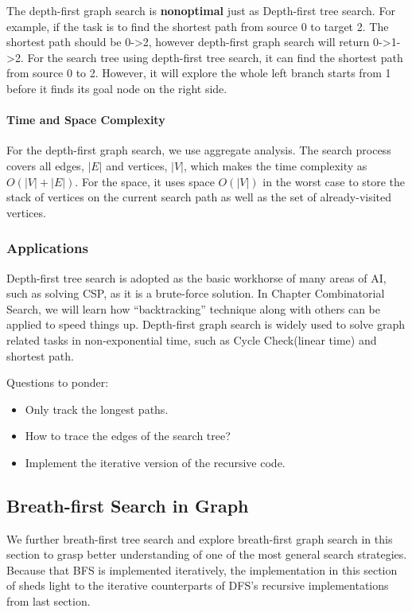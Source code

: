 \documentclass[../main.tex]{subfiles}
\begin{document}
The depth-first graph search is \textbf{nonoptimal} just as Depth-first tree search. For example, if the task is to find the shortest path from source 0 to target 2. The shortest path should be 0->2, however depth-first graph search will return 0->1->2. For the search tree using depth-first tree search, it can find the shortest path from source 0 to 2. However, it will explore the whole left branch starts from 1 before it finds its goal node on the right side. 

\paragraph{Time and Space Complexity}   For the depth-first graph search, we use aggregate analysis. The search process covers all edges, $|E|$ and vertices, $|V|$, which makes the time complexity as $O(|V|+|E|)$. For the space, it uses space $O(|V|)$ in the worst case to
store the stack of vertices on the current search path as well as the set of
already-visited vertices.

\subsubsection{Applications} Depth-first tree search is adopted as the basic workhorse of many areas of AI, such as solving CSP, as it is a brute-force solution. 
In {Chapter Combinatorial Search}, we will learn how ``backtracking'' technique along with others can be applied to speed things up.
Depth-first graph search is widely used to solve graph related tasks in non-exponential time, such as Cycle Check(linear time) and shortest path.  

\begin{bclogo}[couleur = blue!30, arrondi=0.1,logo=\bccrayon,ombre=true]{Questions to ponder: } 
\begin{itemize}
\item Only track the longest paths.
\item How to trace the edges of the search tree?
\item Implement the iterative version of the recursive code.
\end{itemize}
\end{bclogo}

\subsection{Breath-first Search in Graph}
We further breath-first tree search and explore breath-first graph search in this section to grasp better understanding of one of the most general search strategies. Because that BFS is implemented iteratively, the implementation in this section of sheds light to the iterative counterparts of DFS's recursive implementations from last section. 
\end{document}
